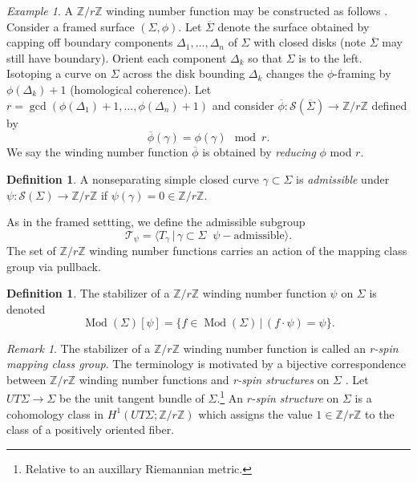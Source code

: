 \documentclass[10pt]{amsart}
\numberwithin{equation}{section}
\theoremstyle{plain}
\theoremstyle{definition}
\newtheorem{defn}[theorem]{Definition}
\theoremstyle{remark}
\newtheorem{rmk}[theorem]{Remark}
\newtheorem{eg}[theorem]{Example}
\DeclareMathOperator{\Mod}{Mod}
\begin{document}
\begin{eg} \label{reduceframing} A $\mathbb{Z}/r\mathbb{Z}$ winding number function may be constructed as follows \cite[Definition 2.6]{Strata3}. Consider a framed surface $(\Sigma,\phi)$. Let $\overline{\Sigma}$ denote the surface obtained by capping off boundary components $\Delta_1,\ldots,\Delta_n$ of $\Sigma$ with closed disks (note $\overline{\Sigma}$ may still have boundary). Orient each component $\Delta_k$ so that $\Sigma$ is to the left. Isotoping a curve on $\Sigma$ across the disk bounding $\Delta_k$ changes the $\phi$-framing by $\phi(\Delta_k)+1$ (homological coherence). Let $r = \gcd(\phi(\Delta_1)+1,\ldots,\phi(\Delta_n)+1)$ and consider $\overline{\phi} : \mathcal{S}(\overline{\Sigma}) \to \mathbb{Z}/r\mathbb{Z}$ defined by \[\overline{\phi}(\gamma) = \phi(\gamma) \mod r.\] We say the winding number function $\overline{\phi}$ is obtained by \textit{reducing} $\phi$ mod $r$.  
\end{eg}


\begin{defn}
A nonseparating simple closed curve $\gamma \subset 
\Sigma$ is \textit{admissible} under $\psi : \mathcal{S}(\Sigma) \to \mathbb{Z}/r\mathbb{Z}$ if $\psi(\gamma) = 0 \in \mathbb{Z}/r\mathbb{Z}$. 
\end{defn}

As in the framed settting, we define the admissible subgroup \[\mathcal{T}_{\psi} = \langle T_{\gamma} \,|\, \gamma \subset \Sigma\;\; \psi-\textrm{admissible}\rangle.\] The set of $\mathbb{Z}/r\mathbb{Z}$ winding number functions carries an action of the mapping class group via pullback. 
\begin{defn} \label{rspinmcg}
The stabilizer of a $\mathbb{Z}/r\mathbb{Z}$ winding number function $\psi$ on $\Sigma$ is denoted
\[\Mod(\Sigma)[\psi] = \{ f\in \Mod(\Sigma) \,|\, (f\cdot \psi) = \psi\}.\]
\end{defn}

\begin{rmk}
The stabilizer of a $\mathbb{Z}/r\mathbb{Z}$ winding number function is called an \textit{r-spin mapping class group}. The terminology is motivated by a bijective correspondence between $\mathbb{Z}/r\mathbb{Z}$ winding number functions and \textit{r-spin structures} on $\Sigma$ \cite[Proposition 3.6]{IshanNick}. Let $UT\Sigma \to \Sigma$ be the unit tangent bundle of $\Sigma$.\footnote{Relative to an auxillary Riemannian metric.} An $r$-\textit{spin structure} on $\Sigma$ is a cohomology class in $H^1(UT\Sigma;\mathbb{Z}/r\mathbb{Z})$ which assigns the value $1\in \mathbb{Z}/r\mathbb{Z}$ to the class of a positively oriented fiber.
\end{rmk}
\end{document}
